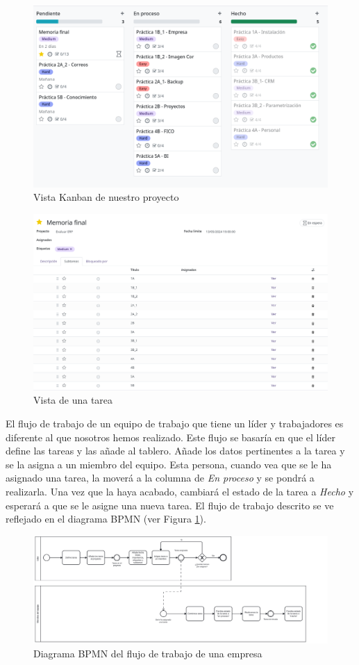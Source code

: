 \begin{figure}[h]
    \centering
    \includegraphics[width=1\linewidth]{proyecto.png}
    \caption{Vista Kanban de nuestro proyecto}
\end{figure}

\begin{figure}[h]
    \centering
    \includegraphics[width=0.75\linewidth]{tareaMemoria.png}
    \caption{Vista de una tarea}
\end{figure}

El flujo de trabajo de un equipo de trabajo que tiene un líder y trabajadores es diferente al que nosotros hemos realizado. Este flujo se basaría en que el líder define las tareas y las añade al tablero. Añade los datos pertinentes a la tarea y se la asigna a un miembro del equipo. Esta persona, cuando vea que se le ha asignado una tarea, la moverá a la columna de \textit{En proceso} y se pondrá a realizarla. Una vez que la haya acabado, cambiará el estado de la tarea a \textit{Hecho} y esperará a que se le asigne una nueva tarea. El flujo de trabajo descrito se ve reflejado en el diagrama BPMN (ver Figura \ref{fig:BMMN_trabajo}). 

\begin{figure}[h]
    \centering
    \includegraphics[width=1\linewidth]{ProjectsBPMN.png}
    \caption{Diagrama BPMN del flujo de trabajo de una empresa}
    \label{fig:BMMN_trabajo}
\end{figure}

